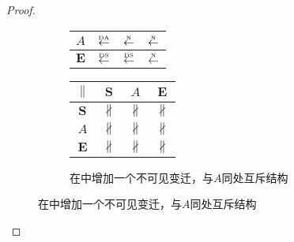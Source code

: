 \begin{proof}
\begin{figure}[htbp]
\begin{subfigure}{1\textwidth}
\begin{minipage}[b]{0.3\textwidth}
\begin{tabular}{|c|c|c|c|}
        $A$ & $\overset{\text{\tiny{DA}}}{\leftarrow}$ & $\overset{\text{\tiny{N}}}{\leftarrow}$ & $\overset{\text{\tiny{N}}}{\leftarrow}$\\ \hline
        $\bm{E}$ & $\overset{\text{\tiny{DS}}}{\leftarrow}$ & $\overset{\text{\tiny{DS}}}{\leftarrow}$ & $\overset{\text{\tiny{N}}}{\leftarrow}$\\ \hline
      \end{tabular}
    \end{minipage}
    \begin{minipage}[b]{0.3\textwidth}
      \vspace{1em}
      \centering
      \begin{tabular}{|c|c|c|c|} \hline
        $\parallel$ & $\bm{S}$ & $A$ & $\bm{E}$\\ \hline
        $\bm{S}$ & $\nparallel$ & $\nparallel$ & $\nparallel$\\ \hline
        $A$ & $\nparallel$ & $\nparallel$ & $\nparallel$\\ \hline
        $\bm{E}$ & $\nparallel$ & $\nparallel$ & $\nparallel$\\ \hline
      \end{tabular}
    \end{minipage}
    \caption{在中增加一个不可见变迁，与$A$同处互斥结构}
    \label{fig:uniqueness_3_c}
  \end{subfigure}


\end{figure}
\end{proof}
